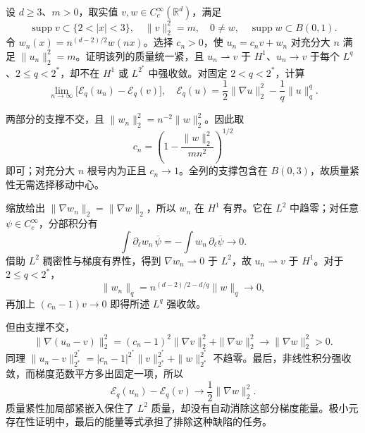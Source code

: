 \begin{exercise}\label{b2:ex:app-F-7}
设 \(d\ge3\)、\(m>0\)，取实值 \(v,w\in C_c^\infty(\mathbb R^d)\)，满足
\[
 \operatorname{supp}v\subset\{2<|x|<3\},\quad
 \|v\|_2^2=m,\quad
 0\ne w,\quad \operatorname{supp}w\subset B(0,1).
\]
令 \(w_n(x)=n^{(d-2)/2}w(nx)\)。选择 \(c_n>0\)，使 \(u_n=c_nv+w_n\) 对充分大 \(n\) 满足 \(\|u_n\|_2^2=m\)。证明该列的质量统一紧，且 \(u_n\rightharpoonup v\) 于 \(H^1\)、\(u_n\to v\) 于每个 \(L^q\)、\(2\le q<2^*\)，却不在 \(H^1\) 或 \(L^{2^*}\) 中强收敛。对固定 \(2<q<2^*\)，计算
\[
 \lim_{n\to\infty}\bigl[\mathcal E_q(u_n)-\mathcal E_q(v)\bigr],
 \quad \mathcal E_q(u)=\frac12\|\nabla u\|_2^2-\frac1q\|u\|_q^q.
\]
\end{exercise}
\begin{solution}
两部分的支撑不交，且 \(\|w_n\|_2^2=n^{-2}\|w\|_2^2\)。因此取
\[
 c_n=\left(1-\frac{\|w\|_2^2}{mn^2}\right)^{1/2}
\]
即可；对充分大 \(n\) 根号内为正且 \(c_n\to1\)。全列的支撑包含在 \(B(0,3)\)，故质量紧性无需选择移动中心。

缩放给出 \(\|\nabla w_n\|_2=\|\nabla w\|_2\)，所以 \(w_n\) 在 \(H^1\) 有界。它在 \(L^2\) 中趋零；对任意 \(\psi\in C_c^\infty\)，分部积分有
\[
 \int\partial_\ell w_n\,\overline\psi
 =-\int w_n\,\partial_\ell\overline\psi\longrightarrow0.
\]
借助 \(L^2\) 稠密性与梯度有界性，得到 \(\nabla w_n\rightharpoonup0\) 于 \(L^2\)，故 \(u_n\rightharpoonup v\) 于 \(H^1\)。对于 \(2\le q<2^*\)，
\[
 \|w_n\|_q=n^{(d-2)/2-d/q}\|w\|_q\longrightarrow0,
\]
再加上 \((c_n-1)v\to0\) 即得所述 \(L^q\) 强收敛。

但由支撑不交，
\[
 \|\nabla(u_n-v)\|_2^2
 =(c_n-1)^2\|\nabla v\|_2^2+\|\nabla w\|_2^2
 \longrightarrow\|\nabla w\|_2^2>0.
\]
同理
\(\|u_n-v\|_{2^*}^{2^*}=|c_n-1|^{2^*}\|v\|_{2^*}^{2^*}+\|w\|_{2^*}^{2^*}\)
不趋零。最后，非线性积分强收敛，而梯度范数平方多出固定一项，所以
\[
 \mathcal E_q(u_n)-\mathcal E_q(v)
 \longrightarrow\frac12\|\nabla w\|_2^2.
\]
质量紧性加局部紧嵌入保住了 \(L^2\) 质量，却没有自动消除这部分梯度能量。极小元存在性证明中，最后的能量等式承担了排除这种缺陷的任务。
\end{solution}


